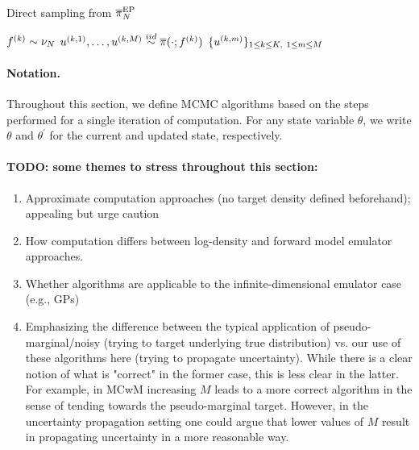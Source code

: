 \documentclass[12pt]{article}
\begin{document}
\begin{algorithm}
    \caption{Direct sampling from $\overline{\pi}_{N}^{\mathrm{EP}}$}
    \label{alg:ep}
    \begin{algorithmic}[1]
        		\State $f^{(k)} \sim \nu_{N}$ 
		\State $u^{(k, 1)}, \dots, u^{(k, M)} \overset{iid}{\sim} \overline{\pi}(\cdot; f^{(k)})$ 
	\EndFor
	\State \Return $\{u^{(k, m)}\}_{1 \leq k \leq K, \ 1 \leq m \leq M}$
	\EndFunction
    \end{algorithmic}
\end{algorithm}

\paragraph{Notation.} Throughout this section, we define MCMC algorithms
based on the steps performed for a single iteration of computation. For any 
state variable $\theta$, we write $\theta$ and $\theta^\prime$ for the current
and updated state, respectively.

\paragraph{TODO: some themes to stress throughout this section:}
\begin{enumerate}
\item Approximate computation approaches (no target density defined beforehand); appealing but urge caution
\item How computation differs between log-density and forward model emulator approaches.
\item Whether algorithms are applicable to the infinite-dimensional emulator case (e.g., GPs)
\item Emphasizing the difference between the typical application of pseudo-marginal/noisy (trying to target underlying true
distribution) vs. our use of these algorithms here (trying to propagate uncertainty). While there is a clear notion of what is
"correct" in the former case, this is less clear in the latter. For example, in MCwM increasing $M$ leads to a 
more correct algorithm in the sense of tending towards the pseudo-marginal target. However, in the uncertainty
propagation setting one could argue that lower values of $M$ result in propagating uncertainty in a more 
reasonable way.
\end{enumerate}
\end{document}
